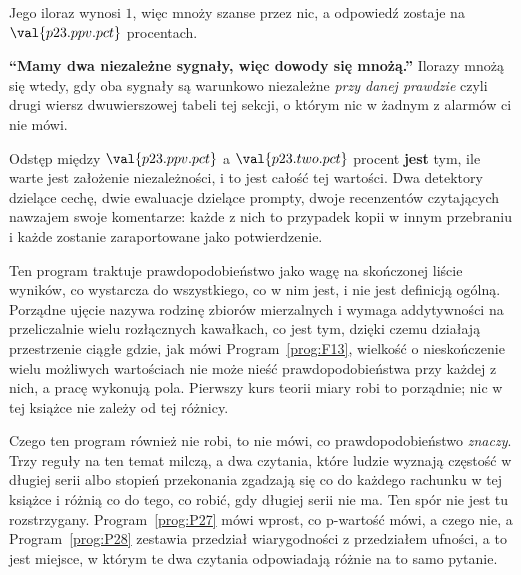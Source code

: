 \begin{fr}
\begin{ansblock}
Jego iloraz wynosi $1$, więc mnoży szanse przez nic, a odpowiedź zostaje na
$\val{p23.ppv.pct}$ procentach.
\end{ansblock}

\begin{trapbox}
\textbf{\enquote{Mamy dwa niezależne sygnały, więc dowody się mnożą.}} Ilorazy
mnożą się wtedy, gdy oba sygnały są warunkowo niezależne \emph{przy danej
prawdzie} \dash{} czyli drugi wiersz dwuwierszowej tabeli tej sekcji, o
którym nic w żadnym z
alarmów ci nie mówi.

Odstęp między $\val{p23.ppv.pct}$ a $\val{p23.two.pct}$ procent \textbf{jest}
tym, ile warte jest założenie niezależności, i to jest całość tej wartości.
Dwa detektory dzielące cechę, dwie ewaluacje dzielące prompty, dwoje
recenzentów czytających nawzajem swoje komentarze: każde z nich to przypadek
kopii w innym przebraniu i każde zostanie zaraportowane jako potwierdzenie.
\end{trapbox}
\end{fr}

\begin{fr}
\begin{rigourbox}
Ten program traktuje prawdopodobieństwo jako wagę na skończonej liście
wyników, co wystarcza do wszystkiego, co w nim jest, i nie jest definicją
ogólną. Porządne ujęcie nazywa rodzinę zbiorów mierzalnych i wymaga
addytywności na przeliczalnie wielu rozłącznych kawałkach, co jest tym, dzięki
czemu działają przestrzenie ciągłe \dash{} gdzie, jak mówi
Program~\ref{prog:F13}, wielkość o nieskończenie wielu możliwych wartościach
nie może nieść prawdopodobieństwa przy każdej z nich, a pracę wykonują pola. Pierwszy kurs teorii miary robi to porządnie; nic w tej książce
nie zależy od tej różnicy.

Czego ten program również nie robi, to nie mówi, co prawdopodobieństwo
\emph{znaczy}. Trzy reguły na ten temat milczą, a dwa czytania, które ludzie
wyznają \dash{} częstość w długiej serii albo stopień przekonania \dash{}
zgadzają się co do każdego rachunku w tej książce i różnią co do tego, co
robić, gdy długiej serii nie ma. Ten spór nie jest tu rozstrzygany.
Program~\ref{prog:P27} mówi wprost, co p-wartość mówi, a czego nie, a
Program~\ref{prog:P28} zestawia przedział wiarygodności z przedziałem ufności,
a to jest miejsce, w którym te dwa czytania odpowiadają różnie na to samo
pytanie.
\end{rigourbox}
\end{fr}

